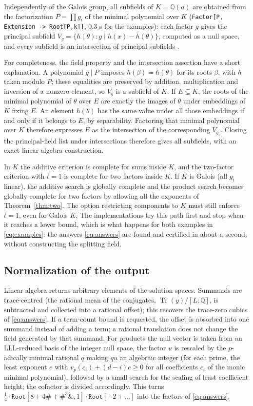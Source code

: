 \documentclass[11pt,a4paper]{article}
\theoremstyle{definition}
\theoremstyle{remark}
\newcommand{\Q}{\mathbb{Q}}
\newcommand{\Tr}{\operatorname{Tr}}
\newcommand{\code}[1]{\texttt{#1}}
\newcommand{\Root}{\code{Root}}
\begin{document}
Independently of the Galois group, all subfields of $K=\Q(a)$ are obtained from the factorization
$P=\prod g_i$ of the minimal polynomial over $K$ (\code{Factor[P, Extension -> Root[P,k]]}, $0.3$ s for
the examples): each factor $g$ gives the principal subfield $V_g=\{h(\theta): g\mid h(x)-h(\theta)\}$,
computed as a null space, and every subfield is an intersection of principal subfields
\cite{SvH,r5,r9}.

For completeness, the field property and the intersection assertion have a short explanation.  A
polynomial $g\mid P$ imposes $h(\beta)=h(\theta)$ for its roots $\beta$, with $h$ taken modulo $P$;
these equalities are preserved by addition, multiplication and inversion of a nonzero element, so
$V_g$ is a subfield of $K$.  If $E\subseteq K$, the roots of the minimal polynomial of $\theta$ over
$E$ are exactly the images of $\theta$ under embeddings of $K$ fixing $E$.  An element $h(\theta)$
has the same value under all those embeddings if and only if it belongs to $E$, by separability.
Factoring that minimal polynomial over $K$ therefore expresses $E$ as the intersection of the
corresponding $V_{g_i}$.  Closing the principal-field list under intersections therefore gives all
subfields, with an exact linear-algebra construction.

In $K$ the additive criterion is complete for sums inside $K$, and the two-factor
criterion with $t=1$ is complete for two factors inside $K$.  If $K$ is Galois (all $g_i$ linear),
the additive search is globally complete and the product search becomes globally complete for two
factors by allowing all the exponents of Theorem~\ref{thm:two}.  The option restricting components to
$K$ must still enforce $t=1$, even for Galois $K$.  The implementations try this path first and stop when it reaches a lower bound,
which is what happens for both examples in \eqref{eq:examples}: the answers \eqref{eq:answers} are found
and certified in about a second, without constructing the splitting field.

\subsection{Normalization of the output}

Linear algebra returns arbitrary elements of the solution spaces.  Summands are trace-centred (the
rational mean of the conjugates, $\Tr(y)/[L:\Q]$, is subtracted and collected into a rational offset);
this recovers the trace-zero cubics of \eqref{eq:answers}.  If a term-count bound is requested, the
offset is absorbed into one summand instead of adding a term; a rational translation does not change
the field generated by that summand.  For products the null vector is taken from
an LLL-reduced basis of the integer null space, the factor $u$ is rescaled by the $p$-adically minimal
rational $q$ making $qu$ an algebraic integer (for each prime, the least exponent $e$ with
$v_p(c_i)+(d-i)e\ge0$ for all coefficients $c_i$ of the monic minimal polynomial), followed by a small
search for the scaling of least coefficient height; the cofactor is divided accordingly.  This turns
$\tfrac1{4}\cdot\Root[8+4\#+\#^3\&,1]\cdot\Root[-2+\ldots]$ into the factors of \eqref{eq:answers}.
\end{document}

